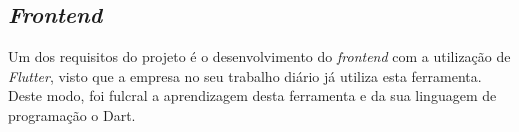 \subsection{\textit{Frontend}}
Um dos requisitos do projeto é o desenvolvimento do \textit{frontend} com a utilização de \textit{Flutter}, visto que a empresa no seu trabalho diário já utiliza esta ferramenta. Deste modo, foi fulcral a aprendizagem desta ferramenta e da sua linguagem de programação o Dart.



\newpage 



\newpage


